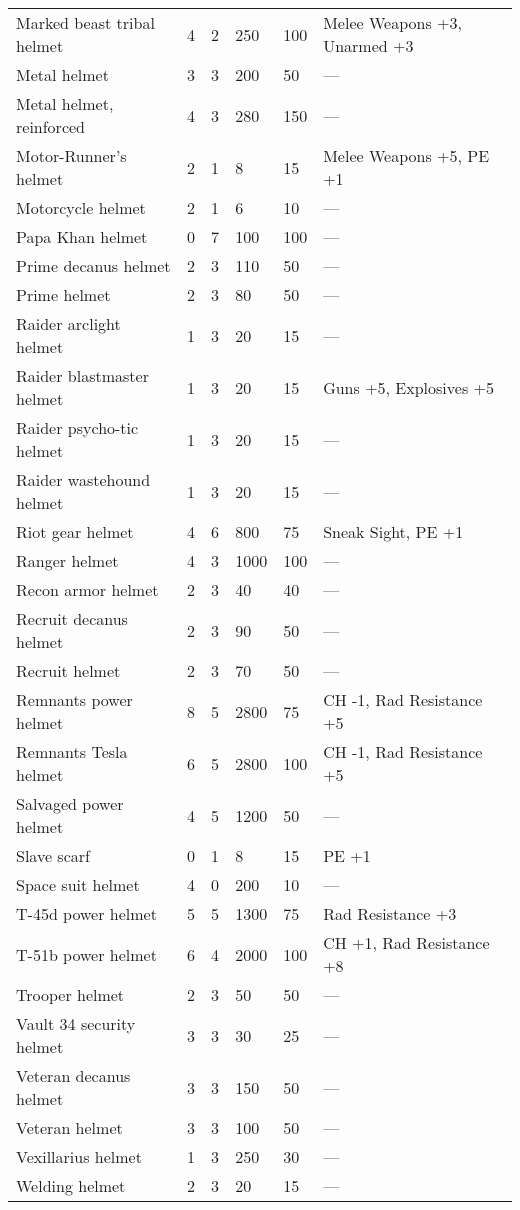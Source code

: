 \begin{longtable}{|p{4cm}|p{1.2cm}|p{1.2cm}|p{1.2cm}|p{1.2cm}|p{4cm}|}
Marked beast tribal helmet & 4 & 2 & 250 & 100 & Melee Weapons +3, Unarmed +3 \\
Metal helmet & 3 & 3 & 200 & 50 & — \\
Metal helmet, reinforced & 4 & 3 & 280 & 150 & — \\
Motor-Runner's helmet & 2 & 1 & 8 & 15 & Melee Weapons +5, PE +1 \\
Motorcycle helmet & 2 & 1 & 6 & 10 & — \\
Papa Khan helmet & 0 & 7 & 100 & 100 & — \\
Prime decanus helmet & 2 & 3 & 110 & 50 & — \\
Prime helmet & 2 & 3 & 80 & 50 & — \\
Raider arclight helmet & 1 & 3 & 20 & 15 & — \\
Raider blastmaster helmet & 1 & 3 & 20 & 15 & Guns +5, Explosives +5 \\
Raider psycho-tic helmet & 1 & 3 & 20 & 15 & — \\
Raider wastehound helmet & 1 & 3 & 20 & 15 & — \\
Riot gear helmet & 4 & 6 & 800 & 75 & Sneak Sight, PE +1 \\
Ranger helmet & 4 & 3 & 1000 & 100 & — \\
Recon armor helmet & 2 & 3 & 40 & 40 & — \\
Recruit decanus helmet & 2 & 3 & 90 & 50 & — \\
Recruit helmet & 2 & 3 & 70 & 50 & — \\
Remnants power helmet & 8 & 5 & 2800 & 75 & CH -1, Rad Resistance +5 \\
Remnants Tesla helmet & 6 & 5 & 2800 & 100 & CH -1, Rad Resistance +5 \\
Salvaged power helmet & 4 & 5 & 1200 & 50 & — \\
Slave scarf & 0 & 1 & 8 & 15 & PE +1 \\
Space suit helmet & 4 & 0 & 200 & 10 & — \\
T-45d power helmet & 5 & 5 & 1300 & 75 & Rad Resistance +3 \\
T-51b power helmet & 6 & 4 & 2000 & 100 & CH +1, Rad Resistance +8 \\
Trooper helmet & 2 & 3 & 50 & 50 & — \\
Vault 34 security helmet & 3 & 3 & 30 & 25 & — \\
Veteran decanus helmet & 3 & 3 & 150 & 50 & — \\
Veteran helmet & 3 & 3 & 100 & 50 & — \\
Vexillarius helmet & 1 & 3 & 250 & 30 & — \\
Welding helmet & 2 & 3 & 20 & 15 & — \\
\hline
\end{longtable}
